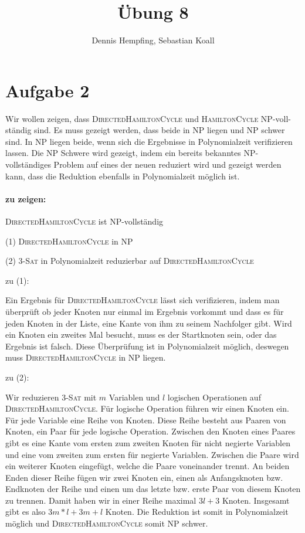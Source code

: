 \documentclass[12pt]{scrartcl}%
\theoremstyle{nonumberplain}
\begin{document}
\author{Dennis Hempfing, Sebastian Koall}
\title{Übung 8}
\date{} 
\pagestyle{myheadings}

\maketitle %

\section*{Aufgabe 2}
Wir wollen zeigen, dass {\scshape DirectedHamiltonCycle} und {\scshape HamiltonCycle} NP-voll-ständig sind.
Es muss gezeigt werden, dass beide in NP liegen und NP schwer sind. In NP liegen beide, wenn sich die Ergebnisse in Polynomialzeit verifizieren lassen. Die NP Schwere wird gezeigt, indem ein bereits bekanntes NP-vollständiges Problem auf eines der neuen reduziert wird und gezeigt werden kann, dass die Reduktion ebenfalls in Polynomialzeit möglich ist.

\paragraph{zu zeigen:} {\scshape DirectedHamiltonCycle} ist NP-vollständig
\vspace{0.2cm}

(1) {\scshape DirectedHamiltonCycle} in NP
\vspace{0.2cm}

(2) {\scshape 3-Sat} in Polynomialzeit reduzierbar auf {\scshape DirectedHamiltonCycle}
\vspace{0.4cm}

zu (1): 

Ein Ergebnis für {\scshape DirectedHamiltonCycle} lässt sich verifizieren, indem man überprüft ob jeder Knoten nur einmal im Ergebnis vorkommt und dass es für jeden Knoten in der Liste, eine Kante von ihm zu seinem Nachfolger gibt. Wird ein Knoten ein zweites Mal besucht, muss es der Startknoten sein, oder das Ergebnis ist falsch. Diese Überprüfung ist in Polynomialzeit möglich, deswegen muss {\scshape DirectedHamiltonCycle} in NP liegen.
\vspace{0.2cm}

zu (2):  

Wir reduzieren {\scshape 3-Sat} mit $m$ Variablen und $l$ logischen Operationen auf {\scshape DirectedHamiltonCycle}. Für logische Operation führen wir einen Knoten ein. Für jede Variable eine Reihe von Knoten. Diese Reihe besteht aus Paaren von Knoten, ein Paar für jede logische Operation. Zwischen den Knoten eines Paares gibt es eine Kante vom ersten zum zweiten Knoten für nicht negierte Variablen und eine vom zweiten zum ersten für negierte Variablen. Zwischen die Paare wird ein weiterer Knoten eingefügt, welche die Paare voneinander trennt. An beiden Enden dieser Reihe fügen wir zwei Knoten ein, einen als Anfangsknoten bzw. Endknoten der Reihe und einen um das letzte bzw. erste Paar von diesem Knoten zu trennen. Damit haben wir in einer Reihe maximal $3l + 3$ Knoten. Insgesamt gibt es also $3m*l + 3m + l$ Knoten. Die Reduktion ist somit in Polynomialzeit möglich und {\scshape DirectedHamiltonCycle} somit NP schwer.
\end{document}

